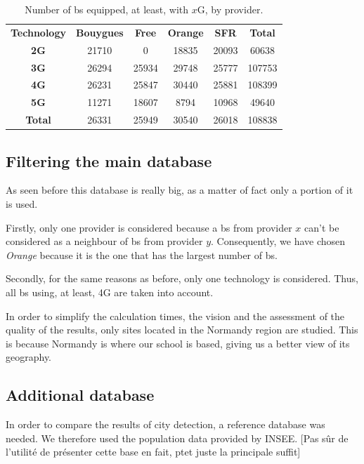 \documentclass[lettersize,journal,english]{IEEEtran}
\begin{document}
        \begin{table}
            \centering
            \caption{Number of \acrshort{bs} equipped, at least, with $x$G, by provider.}
            \label{table:techno_numbers}
            \begin{tabular}{cccccc}
                \toprule
                \textbf{Technology} & \textbf{Bouygues} & \textbf{Free} & \textbf{Orange} & \textbf{SFR} & \textbf{Total} \\
                \cmidrule(lr){1-6}
                \textbf{2G} & 21710 & 0 & 18835 & 20093 & 60638 \\
                \textbf{3G} & 26294 & 25934 & 29748 & 25777 & 107753 \\
                \textbf{4G} & 26231 & 25847 & 30440 & 25881 & 108399 \\
                \textbf{5G} & 11271 & 18607 & 8794 & 10968 & 49640 \\
                \textbf{Total} & 26331 & 25949 & 30540 & 26018 & 108838 \\
                \bottomrule
            \end{tabular}
        \end{table}

    \subsection{Filtering the main database}
        As seen before this database is really big, as a matter of fact only a portion of it is used.

        Firstly, only one provider is considered because a \acrshort{bs} from provider $x$ can't be considered as a neighbour of \acrshort{bs} from provider $y$.
        Consequently, we have chosen \emph{Orange} because it is the one that has the largest number of \acrshort{bs}.

        Secondly, for the same reasons as before, only one technology is considered. Thus, all \acrshort{bs} using, at least, 4G are taken into account.

        In order to simplify the calculation times, the vision and the assessment of the quality of the results, only sites located in the Normandy region are studied.
        This is because Normandy is where our school is based, giving us a better view of its geography.

    \subsection{Additional database}
        In order to compare the results of city detection, a reference database was needed. We therefore used the population data provided by INSEE.
        [Pas sûr de l'utilité de présenter cette base en fait, ptet juste la principale suffit]
\end{document}
